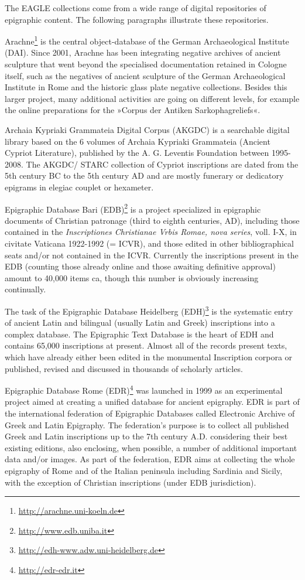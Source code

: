 \documentclass[amsthm,ebook]{saparticle}
\begin{document}
The EAGLE collections come from a wide range of digital repositories of epigraphic content. The following paragraphs
illustrate these repositories.

Arachne\footnote{\url{http://arachne.uni-koeln.de}} is the central object-database of the German Archaeological Institute
(DAI). Since 2001, Arachne has been integrating negative archives of ancient sculpture that went beyond the specialised
documentation retained in Cologne itself, such as the negatives of ancient sculpture of the German Archaeological
Institute in Rome and the historic glass plate negative collections. Besides this larger project, many additional
activities are going on different levels, for example the online preparations for the »Corpus der Antiken
Sarkophagreliefs«.

Archaia Kypriaki Grammateia Digital Corpus (AKGDC) is a searchable digital library based on the 6 volumes of Archaia
Kypriaki Grammateia (Ancient Cypriot Literature), published by the A. G. Leventis Foundation between 1995-2008. The
AKGDC/ STARC collection of Cypriot inscriptions are dated from the 5th century BC to the 5th century AD and are mostly
funerary or dedicatory epigrams in elegiac couplet or hexameter.

Epigraphic Database Bari (EDB)\footnote{\url{http://www.edb.uniba.it}} is a project specialized in epigraphic documents of
Christian patronage (third to eighth centuries, AD), including those contained in the \emph{Inscriptiones Christianae Vrbis
Romae, nova series}, voll. I-X, in civitate Vaticana 1922-1992 (= ICVR), and those edited in other bibliographical seats
and/or not contained in the ICVR. Currently the inscriptions present in the EDB (counting those already online and
those awaiting definitive approval) amount to 40,000 items ca, though this number is obviously increasing continually. 

The task of the Epigraphic Database Heidelberg (EDH)\footnote{\url{http://edh-www.adw.uni-heidelberg.de}} is the systematic
entry of ancient Latin and bilingual (usually Latin and Greek) inscriptions into a complex database. The Epigraphic
Text Database is the heart of EDH and contains 65,000 inscriptions at present. Almost all of the records present texts,
which have already either been edited in the monumental Inscription corpora or published, revised and discussed in
thousands of scholarly articles.

Epigraphic Database Rome (EDR)\footnote{\url{http://edr-edr.it}} was launched in 1999 as an experimental project aimed at
creating a unified database for ancient epigraphy. EDR is part of the international federation of Epigraphic Databases
called Electronic Archive of Greek and Latin Epigraphy. The federation’s purpose is to collect all published Greek and
Latin inscriptions up to the 7th century A.D. considering their best existing editions, also enclosing, when possible,
a number of additional important data and/or images. As part of the federation, EDR aims at collecting the whole
epigraphy of Rome and of the Italian peninsula including Sardinia and Sicily, with the exception of Christian
inscriptions (under EDB jurisdiction).
\end{document}
